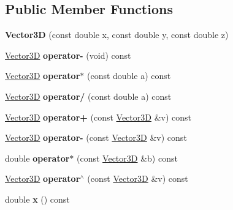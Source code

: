 \subsection*{Public Member Functions}
\begin{DoxyCompactItemize}
\item 
\hypertarget{class_vector3_d_a9c58f21ac5a280f62067d7f26466ba47}{}\label{class_vector3_d_a9c58f21ac5a280f62067d7f26466ba47} 
{\bfseries Vector3D} (const double x, const double y, const double z)
\item 
\hypertarget{class_vector3_d_a5fc1291699c792e6acd5ea453c47f3f4}{}\label{class_vector3_d_a5fc1291699c792e6acd5ea453c47f3f4} 
\hyperlink{class_vector3_d}{Vector3D} {\bfseries operator-\/} (void) const
\item 
\hypertarget{class_vector3_d_afa1d5717e088826b6dcc0cb35ec836f7}{}\label{class_vector3_d_afa1d5717e088826b6dcc0cb35ec836f7} 
\hyperlink{class_vector3_d}{Vector3D} {\bfseries operator$\ast$} (const double a) const
\item 
\hypertarget{class_vector3_d_a86a2dec32df2740e92e06b651d693c95}{}\label{class_vector3_d_a86a2dec32df2740e92e06b651d693c95} 
\hyperlink{class_vector3_d}{Vector3D} {\bfseries operator/} (const double a) const
\item 
\hypertarget{class_vector3_d_af75a42c25ca6e999f3e7a83d4de105c6}{}\label{class_vector3_d_af75a42c25ca6e999f3e7a83d4de105c6} 
\hyperlink{class_vector3_d}{Vector3D} {\bfseries operator+} (const \hyperlink{class_vector3_d}{Vector3D} \&v) const
\item 
\hypertarget{class_vector3_d_acd7927ced75a36b459200a791e51acad}{}\label{class_vector3_d_acd7927ced75a36b459200a791e51acad} 
\hyperlink{class_vector3_d}{Vector3D} {\bfseries operator-\/} (const \hyperlink{class_vector3_d}{Vector3D} \&v) const
\item 
\hypertarget{class_vector3_d_a307962a6472b58ac85af69ad74c4fd6f}{}\label{class_vector3_d_a307962a6472b58ac85af69ad74c4fd6f} 
double {\bfseries operator$\ast$} (const \hyperlink{class_vector3_d}{Vector3D} \&b) const
\item 
\hypertarget{class_vector3_d_ac6d8d994b5c80eaaed1f033fd7baa627}{}\label{class_vector3_d_ac6d8d994b5c80eaaed1f033fd7baa627} 
\hyperlink{class_vector3_d}{Vector3D} {\bfseries operator$^\wedge$} (const \hyperlink{class_vector3_d}{Vector3D} \&v) const
\item 
\hypertarget{class_vector3_d_ac86d9a556616f4c51fecbaf7d8658ce8}{}\label{class_vector3_d_ac86d9a556616f4c51fecbaf7d8658ce8} 
double {\bfseries x} () const
\item 

\end{DoxyCompactItemize}
